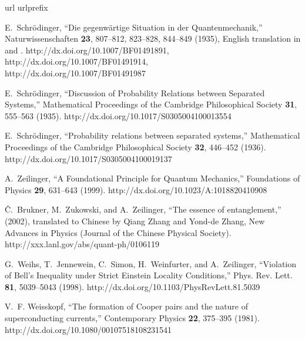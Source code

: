 \documentclass[fleqn,twoside]{article}      %
\begin{document}
\begin{thebibliography}{10}
\newcommand{\enquote}[1]{``#1''}
\expandafter\ifx\csname url\endcsname\relax
  \def\url#1{{#1}}\fi
\expandafter\ifx\csname urlprefix\endcsname\relax\def\urlprefix{}\fi

E.~Schr{\"{o}}dinger, \enquote{Die gegenw{\"{a}}rtige {S}ituation in der
  {Q}uantenmechanik,} Naturwissenschaften {\bf 23}, 807--812, 823--828,
  844--849 (1935), {E}nglish translation in \cite{trimmer} and \cite[pp.
  152-167]{wheeler-Zurek:83}.
\newline http://dx.doi.org/10.1007/BF01491891,
  \\http://dx.doi.org/10.1007/BF01491914,
  \\http://dx.doi.org/10.1007/BF01491987

E.~Schr{\"{o}}dinger, \enquote{Discussion of Probability Relations between
  Separated Systems,} Mathematical Proceedings of the Cambridge Philosophical
  Society {\bf 31}, 555--563 (1935).
\newline http://dx.doi.org/10.1017/S0305004100013554

E.~Schr{\"{o}}dinger, \enquote{Probability relations between separated
  systems,} Mathematical Proceedings of the Cambridge Philosophical Society
  {\bf 32}, 446--452 (1936).
\newline http://dx.doi.org/10.1017/S0305004100019137

A.~Zeilinger, \enquote{A Foundational Principle for Quantum Mechanics,}
  Foundations of Physics {\bf 29}, 631--643 (1999).
\newline http://dx.doi.org/10.1023/A:1018820410908

{\v{C}}.~Brukner, M.~Zukowski, and A.~Zeilinger, \enquote{The essence of
  entanglement,}  (2002), translated to Chinese by Qiang Zhang and Yond-de
  Zhang, New Advances in Physics (Journal of the Chinese Physical Society).
\newline http://xxx.lanl.gov/abs/quant-ph/0106119

G.~Weihs, T.~Jennewein, C.~Simon, H.~Weinfurter, and A.~Zeilinger,
  \enquote{Violation of {B}ell's Inequality under Strict {E}instein Locality
  Conditions,} Phys. Rev. Lett. {\bf 81}, 5039--5043 (1998).
\newline http://dx.doi.org/10.1103/PhysRevLett.81.5039

V.~F. Weisskopf, \enquote{The formation of {C}ooper pairs and the nature of
  superconducting currents,} Contemporary Physics {\bf 22}, 375--395 (1981).
\newline http://dx.doi.org/10.1080/00107518108231541


\end{thebibliography}
\end{document}
